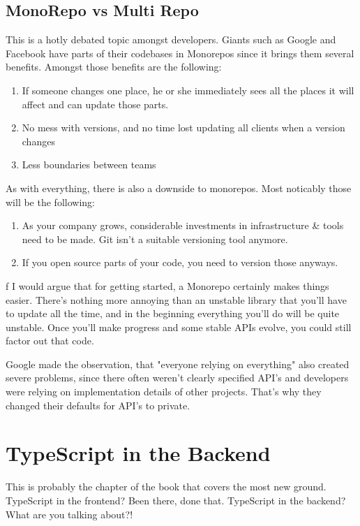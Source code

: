 \documentclass[12pt,a4paper]{report}
\begin{document}
\section{MonoRepo vs Multi Repo}
This is a hotly debated topic amongst developers. Giants such as Google and Facebook have parts of their codebases in Monorepos since it brings them several benefits. Amongst those benefits are the following:

\begin{enumerate}
\item If someone changes one place, he or she immediately sees all the places it will affect and can update those parts.
\item No mess with versions, and no time lost updating all clients when a version changes
\item Less boundaries between teams
\end{enumerate}

As with everything, there is also a downside to monorepos. Most noticably those will be the following:

\begin{enumerate}
\item As your company grows, considerable investments in infrastructure \& tools need to be made. Git isn't a suitable versioning tool anymore.
\item If you open source parts of your code, you need to version those anyways.
\end{enumerate}
f
I would argue that for getting started, a Monorepo certainly makes things easier. There's nothing more annoying than an unstable library that you'll have to update all the time, and in the beginning everything you'll do will be quite unstable. Once you'll make progress and some stable APIs evolve, you could still factor out that code.

Google made the observation, that "everyone relying on everything" also created severe problems, since there often weren't clearly specified API's and developers were relying on implementation details of other projects. That's why they changed their defaults for API's to private.

\chapter{TypeScript in the Backend}

This is probably the chapter of the book that covers the most new ground. TypeScript in the frontend? Been there, done that. TypeScript in the backend? What are you talking about?!
\end{document}
